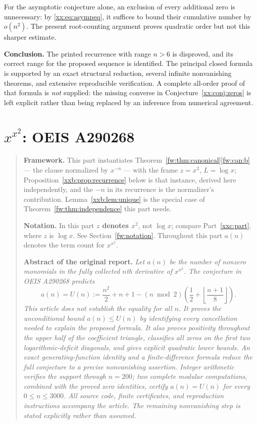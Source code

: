 \documentclass[11pt,a4paper]{article}
\numberwithin{equation}{section}
\theoremstyle{definition}
\theoremstyle{remark}
\theoremstyle{plain}
\newcommand{\U}{U}
\begin{document}
For the asymptotic conjecture alone, an exclusion of every additional zero
is unnecessary: by \eqref{xx:eq:asympeq}, it suffices to bound their cumulative
number by $o(n^2)$. The present root-counting argument proves quadratic
order but not this sharper estimate.

\medskip
\noindent\textbf{Conclusion.}
The printed recurrence with range $n>6$ is disproved, and its correct
range for the proposed sequence is identified. The principal closed formula
is supported by an exact structural reduction, several infinite
nonvanishing theorems, and extensive reproducible verification. A complete
all-order proof of that formula is \emph{not} supplied: the missing converse
in Conjecture~\ref{xx:conj:zeros} is left explicit rather than being replaced
by an inference from numerical agreement.

\clearpage
\section{\texorpdfstring{$x^{x^2}$}{x^(x^2)}: OEIS A290268}\label{xxb:part}

\begin{quote}\small
\textbf{Framework.}  This part instantiates
Theorem~\ref{fw:thm:canonical}\ref{fw:can:b} --- the clause normalized by
$x^{-n}$ --- with the frame $z=x^2$, $L=\log x$;
Proposition~\ref{xxb:prop:recurrence} below is that instance, derived here
independently, and the $-n$ in its recurrence is the normalizer's contribution.
Lemma~\ref{xxb:lem:unique} is the special case of
Theorem~\ref{fw:thm:independence} this part needs.

\smallskip
\textbf{Notation.}  In this part \textbf{$z$ denotes $x^2$}, not $\log x$;
compare Part~\ref{xxc:part}, where $z$ is $\log x$.  See
Section~\ref{fw:notation}.  Throughout this part $a(n)$ denotes the term count
for $x^{x^2}$.

\medskip
\textbf{Abstract of the original report.}\itshape
Let $a(n)$ be the number of nonzero monomials in the fully collected $n$th
derivative of $x^{x^2}$. The conjecture in OEIS A290268 predicts
\[
 a(n)=\U(n):=\frac{n^2}{2}+n+1
 -(n\bmod2)\left(\frac12+\left\lfloor\frac{n+1}{8}\right\rfloor\right).
\]
This article does \upshape\emph{not}\itshape{} establish the equality for all
$n$. It proves the
unconditional bound $a(n)\le\U(n)$ by identifying every cancellation needed to
explain the proposed formula. It also proves positivity throughout the upper
half of the coefficient triangle, classifies all zeros on the first two
logarithmic-deficit diagonals, and gives explicit quadratic lower bounds.
An exact generating-function identity and a finite-difference formula reduce
the full conjecture to a precise nonvanishing assertion. Integer arithmetic
verifies the support through $n=200$; two complete modular computations,
combined with the proved zero identities, certify $a(n)=\U(n)$ for every
$0\le n\le3000$. All source code, finite certificates, and reproduction
instructions accompany the article. The remaining nonvanishing step is
stated explicitly rather than assumed.
\end{quote}
\end{document}
